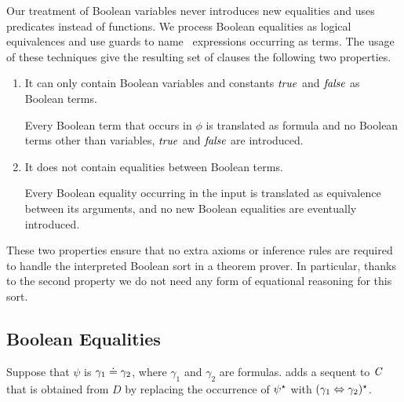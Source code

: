 Our treatment of Boolean variables never introduces new equalities and uses \Skolem{} predicates instead of \Skolem{} functions.
We process Boolean equalities as logical equivalences and use guards to name \ITE\ expressions occurring as terms. The usage of these techniques give the resulting set of clauses the following two properties.
\begin{enumerate}
  \item It can only contain Boolean variables and constants $\mathit{true}$ and $\mathit{false}$ as Boolean terms. 
  
  Every Boolean term that occurs in $\phi$ is translated as formula and no Boolean terms other than variables, $\mathit{true}$ and $\mathit{false}$ are introduced. 
  \item It does not contain equalities between Boolean terms. \label{item_no_eq} 
  
  Every Boolean equality occurring in the input is translated as equivalence between its arguments, and no new Boolean equalities are eventually introduced.
\end{enumerate}
These two properties ensure that 
no extra axioms or inference rules are required to handle the interpreted Boolean sort in a theorem prover.
In particular, thanks to the second property we do not need any form of equational reasoning for this sort.


\subsection*{Boolean Equalities}
Suppose that $\psi$ is $\gamma_1 \doteq \gamma_2$, where $\gamma_1$ and $\gamma_2$ are formulas.
\nfcnf{} adds a sequent to $\mathit{C}$ that is obtained from $D$ by replacing the occurrence of ${\psi}^{\star}$ 
with $(\gamma_1 \Leftrightarrow \gamma_2)^{\star}$.

